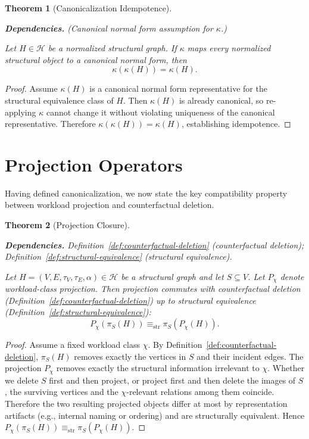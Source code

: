 \documentclass[11pt]{article}
\newtheorem{theorem}{Theorem}
\newcommand{\deps}[1]{\par\noindent\textbf{Dependencies.} #1\par}
\begin{document}
\begin{theorem}[Canonicalization Idempotence]
\label{thm:canonicalization-idempotence}
\deps{(Canonical normal form assumption for $\kappa$.)}
Let $H\in\mathcal H$ be a normalized structural graph.
If $\kappa$ maps every normalized structural object to a canonical normal form, then
\[
\kappa(\kappa(H))=\kappa(H).
\]
\end{theorem}
\begin{proof}
Assume $\kappa(H)$ is a canonical normal form representative for the structural equivalence class of $H$.
Then $\kappa(H)$ is already canonical, so re-applying $\kappa$ cannot change it without violating uniqueness of the canonical representative.
Therefore $\kappa(\kappa(H))=\kappa(H)$, establishing idempotence.
\end{proof}

\section{Projection Operators}
\label{sec:projection-operators}

Having defined canonicalization, we now state the key compatibility property between workload projection and counterfactual deletion.

\begin{theorem}[Projection Closure]
\label{thm:projection-closure}
\deps{Definition~\ref{def:counterfactual-deletion} (counterfactual deletion); Definition~\ref{def:structural-equivalence} (structural equivalence).}
Let $H=(V,E,\tau_V,\tau_E,\alpha)\in\mathcal H$ be a structural graph and let $S\subseteq V$.
Let $P_\chi$ denote workload-class projection.
Then projection commutes with counterfactual deletion (Definition~\ref{def:counterfactual-deletion}) up to structural equivalence (Definition~\ref{def:structural-equivalence}):
\[
P_\chi(\pi_S(H)) \equiv_{\mathrm{str}} \pi_S(P_\chi(H)).
\]
\end{theorem}
\begin{proof}
Assume a fixed workload class $\chi$.
By Definition~\ref{def:counterfactual-deletion}, $\pi_S(H)$ removes exactly the vertices in $S$ and their incident edges.
The projection $P_\chi$ removes exactly the structural information irrelevant to $\chi$.
Whether we delete $S$ first and then project, or project first and then delete the images of $S$, the surviving vertices and the $\chi$-relevant relations among them coincide.
Therefore the two resulting projected objects differ at most by representation artifacts (e.g., internal naming or ordering) and are structurally equivalent.
Hence $P_\chi(\pi_S(H)) \equiv_{\mathrm{str}} \pi_S(P_\chi(H))$.
\end{proof}
\end{document}
